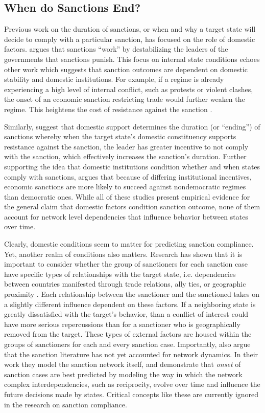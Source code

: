 \subsection*{When do Sanctions End?}
\label{lit}

Previous work on the duration of sanctions, or when and why a target state will decide to comply with a particular sanction, has focused on the role of domestic factors. \cite{marinov2005} argues that sanctions ``work'' by destabilizing the leaders of the governments that sanctions punish. This focus on internal state conditions echoes other work which suggests that sanction outcomes are dependent on domestic stability and domestic institutions. For example, if a regime is already experiencing a high level of internal conflict, such as protests or violent clashes, the onset of an economic sanction restricting trade would further weaken the regime. This heightens the cost of resistance against the sanction \citep{dashti1997}. 

Similarly, \cite{dorussen2001} suggest that domestic support determines the duration (or ``ending'') of sanctions whereby when the target state's domestic constituency supports resistance against the sanction, the leader has greater incentive to not comply with the sanction, which effectively increases the sanction's duration. Further supporting the idea that domestic institutions condition whether and when states comply with sanctions, \cite{lektzian2007} argues that because of differing institutional incentives, economic sanctions are more likely to succeed against nondemocratic regimes than democratic ones. While all of these studies present empirical evidence for the general claim that domestic factors condition sanction outcome, none of them account for network level dependencies that influence behavior between states over time. 

Clearly, domestic conditions seem to matter for predicting sanction compliance. Yet, another realm of conditions also matters. Research has shown that it is important to consider whether the group of sanctioners for each sanction case have specific types of relationships with the target state, i.e. dependencies between countries manifested through trade relations, ally ties, or geographic proximity \citep{mclean2010friends}.  Each relationship between the sanctioner and the sanctioned takes on a slightly different influence dependent on these factors. If a neighboring state is greatly dissatisfied with the target's behavior, than a conflict of interest could have more serious repercussions than for a sanctioner who is geographically removed from the target. These types of external factors are housed within the groups of sanctioners for each and every sanction case. Importantly, \citet{cranmer2014reciprocity} also argue that the sanction literature has not yet accounted for network dynamics. In their work they model the sanction network itself, and demonstrate that \textit{onset} of sanction cases are best predicted by modeling the way in which the network complex interdependencies, such as reciprocity, evolve over time and influence the future decisions made by states. Critical concepts like these are currently ignored in the research on sanction compliance. 

